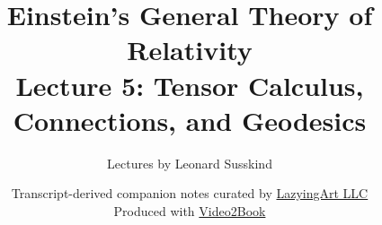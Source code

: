 \documentclass[11pt,oneside]{book}
\begin{document}
\frontmatter
\hypersetup{pageanchor=false}
\title{Einstein's General Theory of Relativity\\[0.45em]
\large Lecture 5: Tensor Calculus, Connections, and Geodesics}
\author{Lectures by Leonard Susskind}
\date{Transcript-derived companion notes curated by
\href{https://lazying.art}{LazyingArt LLC}\\[0.35em]
\small Produced with
\href{https://github.com/lachlanchen/Video2Book}{Video2Book}}
\maketitle
\hypersetup{pageanchor=true}
\clearpage
\mainmatter

\end{document}
